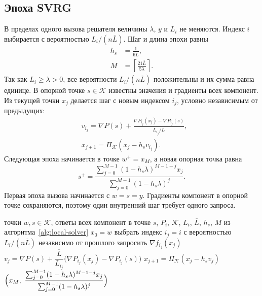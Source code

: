 \subsection{Эпоха SVRG}
В пределах одного вызова решателя величины $\lambda$, $y$ и $L_i$ не меняются. Индекс $i$ выбирается с вероятностью $L_i/(n\overline L)$.
Шаг и длина эпохи равны
\begin{equation}\label{eq:svrg-parameters}
 \begin{aligned}
 h_s&=\frac1{6\overline L},\\
 M&=\left\lceil\frac{21\overline L}{5\lambda}\right\rceil.
 \end{aligned}
\end{equation}
Так как $L_i\ge\lambda>0$, все вероятности $L_i/(n\overline L)$ положительны и их сумма равна единице.
В опорной точке $s\in\mathcal K$ известны значения и градиенты всех компонент. Из текущей точки
$x_j$ делается шаг с новым индексом $i_j$, условно независимым от предыдущих:
\begin{equation}\label{eq:svrg-step}
 \begin{aligned}
 &v_{i_j}=\nabla P(s)+\frac{\nabla P_{i_j}(x_j)-\nabla P_{i_j}(s)}{L_{i_j}/\overline L},\\
 &x_{j+1}=\Pi_{\mathcal K}(x_j-h_sv_{i_j}).
 \end{aligned}
\end{equation}
Следующая эпоха начинается в точке $w^+=x_M$, а новая опорная точка равна
\begin{equation}\label{eq:svrg-average}
 s^+=\frac{\sum_{j=0}^{M-1}(1-h_s\lambda)^{M-1-j}x_j}
          {\sum_{j=0}^{M-1}(1-h_s\lambda)^j}.
\end{equation}
Первая эпоха вызова начинается с $w=s=y$. Градиенты компонент
в опорной точке сохраняются, поэтому один внутренний шаг требует
одного запроса.


\begin{algorithm}[H]
\caption{\textsc{Эпоха}$(w,s)$: эпоха SVRG для локальной задачи}\label{alg:svrg-epoch}
\begin{algorithmic}[1]
\Require точки $w,s\in\mathcal K$, ответы всех компонент в точке $s$,
$P_i$, $\mathcal K$, $L_i$, $\overline L$, $h_s$, $M$ из алгоритма~\ref{alg:local-solver}
\State $x_0=w$
 \State выбрать индекс $i_j=i$ с вероятностью $L_i/(n\overline L)$ независимо от прошлого
 \State запросить $\nabla f_{i_j}(x_j)$
 \State $v_j=\nabla P(s)+\dfrac{\overline L}{L_{i_j}}\bigl(\nabla P_{i_j}(x_j)-\nabla P_{i_j}(s)\bigr)$
 \State $x_{j+1}=\Pi_{\mathcal K}(x_j-h_sv_j)$
\EndFor
\State \Return $\Bigl(x_M,\ \dfrac{\sum_{j=0}^{M-1}(1-h_s\lambda)^{M-1-j}x_j}{\sum_{j=0}^{M-1}(1-h_s\lambda)^j}\Bigr)$
\end{algorithmic}
\end{algorithm}

